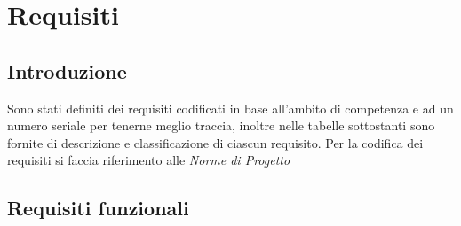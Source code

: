 


\section{Requisiti}
\subsection{Introduzione}
Sono stati definiti dei requisiti codificati in base all’ambito di competenza e ad un numero seriale per
tenerne meglio traccia, inoltre nelle tabelle sottostanti sono fornite di descrizione e classificazione di ciascun
requisito. 
Per la codifica dei requisiti si faccia riferimento alle \textit{Norme di Progetto}
\subsection{Requisiti funzionali}

